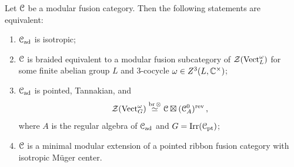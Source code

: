 \documentclass[11pt]{article}
\begin{document}
\begin{thm} \label{t:iso_adj}
Let $\mathcal{C}$ be a modular fusion category.	Then the following statements are equivalent: 
\begin{enumerate}
    \item $\mathcal{C}_{{\operatorname{ad}}}$ is isotropic;
    \item $\mathcal{C}$ is braided equivalent to a modular fusion subcategory of $\zdr(\Vec_{L}^\w)$ for some finite abelian group $L$ and 3-cocycle $\omega \in Z^3(L, {\mathbb{C}}^\times)$;
    \item  $\mathcal{C}_{\operatorname{ad}}$ is pointed, Tannakian,  and 
$$
\zdr(\Vec_{G}^\w) \stackrel{\br \o}{\simeq}\CC\boxtimes(\CC_A^0)^{\rev}\,,
$$
where $A$ is the regular algebra of $\mathcal{C}_{{\operatorname{ad}}}$ and $G={\operatorname{Irr}}(\mathcal{C}_{{\operatorname{pt}}})$;
    \item $\mathcal{C}$ is a minimal modular extension of a pointed ribbon fusion category with isotropic M\"uger center.
\end{enumerate}
\end{thm}
\end{document}
